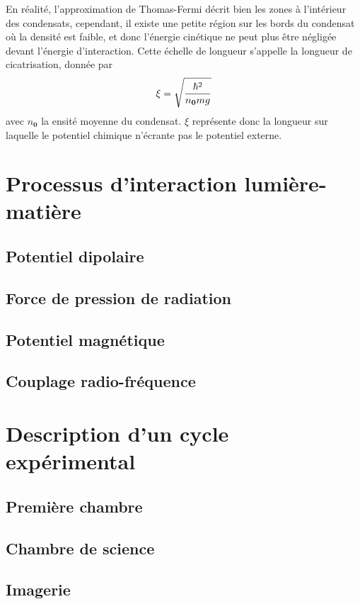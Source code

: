 En réalité, l'approximation de Thomas-Fermi décrit bien les zones à l'intérieur des condensats, cependant, il existe une petite région sur les bords du condensat où la densité est faible, et donc l'énergie cinétique ne peut plus être négligée devant l'énergie d'interaction. Cette échelle de longueur s'appelle la longueur de cicatrisation, donnée par 
\begin{equation}
\xi=\sqrt{\frac{\hslash^2}{n_{\mathbf{0}} mg}}
\end{equation}
avec $n_{\mathbf{0}}$ la ensité moyenne du condensat. $\xi$ représente donc la longueur sur laquelle le potentiel chimique n'écrante pas le potentiel externe.


\section{Processus d'interaction lumière-matière} 
\subsection{Potentiel dipolaire}
\subsection{Force de pression de radiation}
\subsection{Potentiel magnétique}
\subsection{Couplage radio-fréquence} 

\section{Description d'un cycle expérimental}
\subsection{Première chambre}
\subsection{Chambre de science}
\subsection{Imagerie}




